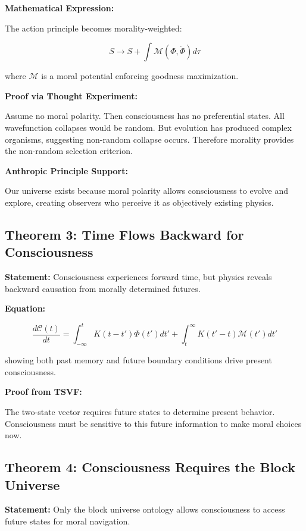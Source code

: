 \documentclass[12pt,a4paper]{article}
\theoremstyle{definition}
\begin{document}
{\bf Mathematical Expression:}

The action principle becomes morality-weighted:

\begin{equation}
S \rightarrow S + \int \mathcal{M}(\Phi, \dot{\Phi}) d\tau
\end{equation}

where $\mathcal{M}$ is a moral potential enforcing goodness maximization.

{\bf Proof via Thought Experiment:}

Assume no moral polarity. Then consciousness has no preferential states. All wavefunction collapses would be random. But evolution has produced complex organisms, suggesting non-random collapse occurs. Therefore morality provides the non-random selection criterion.

{\bf Anthropic Principle Support:}

Our universe exists because moral polarity allows consciousness to evolve and explore, creating observers who perceive it as objectively existing physics.

\subsection{Theorem 3: Time Flows Backward for Consciousness}
{\bf Statement:} Consciousness experiences forward time, but physics reveals backward causation from morally determined futures.

{\bf Equation:}

\begin{equation}
\frac{d\mathcal{C}(t)}{dt} = \int_{-\infty}^{t} K(t-t') \Phi(t') dt' + \int_{t}^{\infty} K(t'-t) \mathcal{M}(t') dt'
\end{equation}

showing both past memory and future boundary conditions drive present consciousness.

{\bf Proof from TSVF:}

The two-state vector requires future states to determine present behavior. Consciousness must be sensitive to this future information to make moral choices now.

\subsection{Theorem 4: Consciousness Requires the Block Universe}
{\bf Statement:} Only the block universe ontology allows consciousness to access future states for moral navigation.
\end{document}
